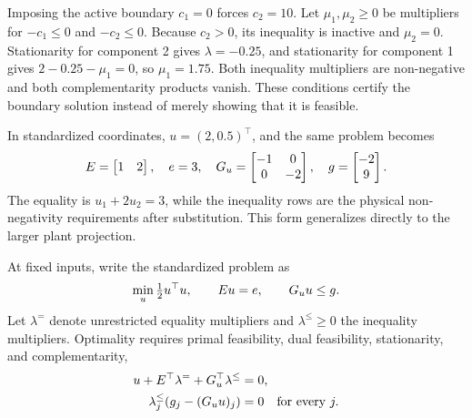 Imposing the active boundary $c_1=0$ forces $c_2=10$. Let $\mu_1,\mu_2\ge0$ be multipliers for $-c_1\le0$ and $-c_2\le0$. Because $c_2>0$, its inequality is inactive and $\mu_2=0$. Stationarity for component 2 gives $\lambda=-0.25$, and stationarity for component 1 gives $2-0.25-\mu_1=0$, so $\mu_1=1.75$. Both inequality multipliers are non-negative and both complementarity products vanish. These conditions certify the boundary solution instead of merely showing that it is feasible.

In standardized coordinates, $u=(2,0.5)^\top$, and the same problem becomes
\begin{equation}
\equationname{Standardized matrices of the illustrative two-component projection}
E=\begin{bmatrix}1&2\end{bmatrix},\quad e=3,\quad
G_u=\begin{bmatrix}-1&0\\0&-2\end{bmatrix},\quad
g=\begin{bmatrix}-2\\9\end{bmatrix}.
\end{equation}
The equality is $u_1+2u_2=3$, while the inequality rows are the physical non-negativity requirements after substitution. This form generalizes directly to the larger plant projection.

At fixed inputs, write the standardized problem as
\begin{equation}
\equationname{Standardized quadratic projection with equalities and inequalities}
\min_u\tfrac12u^\top u,\qquad Eu=e,\qquad G_uu\le g.
\label{eq:plant_standard_projection}
\end{equation}
Let $\lambda^=$ denote unrestricted equality multipliers and $\lambda^\le\ge0$ the inequality multipliers. Optimality requires primal feasibility, dual feasibility, stationarity, and complementarity,
\begin{align}
\equationname{Stationarity condition for the plant quadratic projection}
u+E^\top\lambda^=+G_u^\top\lambda^\le&=0,\\
\equationname{Complementarity condition for the projection inequality multipliers}
\lambda^\le_j(g_j-(G_uu)_j)&=0\quad\text{for every }j.
\label{eq:plant_projection_optimality}
\end{align}

